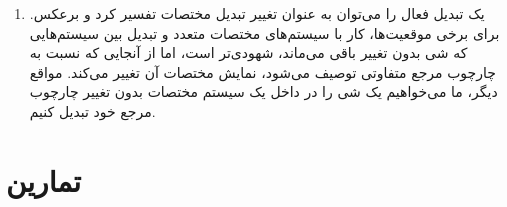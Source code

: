 {\begin{spacing}{1.5}
\begin{enumerate}[label=\textbf{\arabic*}.]
            \item {یک تبدیل فعال را می‌توان به عنوان تغییر تبدیل مختصات تفسیر کرد و برعکس.
            برای برخی موقعیت‌ها، کار با سیستم‌های مختصات متعدد و تبدیل بین سیستم‌هایی که شی بدون تغییر باقی می‌ماند، شهودی‌تر است،
            اما از آنجایی که نسبت به چارچوب مرجع متفاوتی توصیف می‌شود، نمایش مختصات آن تغییر می‌کند.
            مواقع دیگر، ما می‌خواهیم یک شی را در داخل یک سیستم مختصات بدون تغییر چارچوب مرجع خود تبدیل کنیم.}
        \end{enumerate}
    \end{spacing}
}
\newpage


\section{\textbf{تمارین}}
\label{sec:3.8}
